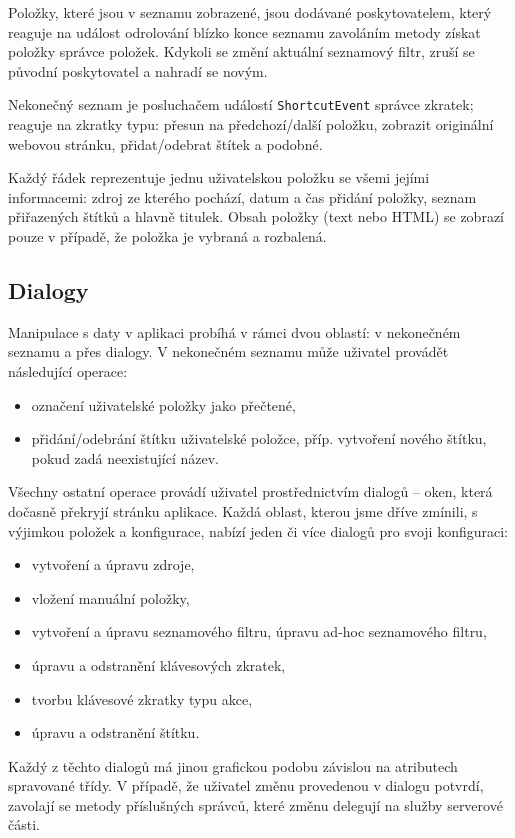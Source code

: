 Položky, které jsou v seznamu zobrazené, jsou dodávané poskytovatelem, který reaguje na událost odrolování blízko konce seznamu zavoláním metody získat položky správce položek.
Kdykoli se změní aktuální seznamový filtr, zruší se původní poskytovatel a nahradí se novým.

Nekonečný seznam je posluchačem událostí \verb|ShortcutEvent| správce zkratek; reaguje na zkratky typu: přesun na předchozí/další položku, zobrazit originální webovou stránku, přidat/odebrat štítek a podobné.

Každý řádek reprezentuje jednu uživatelskou položku se všemi jejími informacemi: zdroj ze kterého pochází, datum a čas přidání položky, seznam přiřazených štítků a hlavně titulek.
Obsah položky (text nebo HTML) se zobrazí pouze v případě, že položka je vybraná a rozbalená.

\subsection{Dialogy}
Manipulace s daty v aplikaci probíhá v rámci dvou oblastí: v nekonečném seznamu a přes dialogy.
V nekonečném seznamu může uživatel provádět následující operace:
\begin{itemize}
	\item označení uživatelské položky jako přečtené,
	\item přidání/odebrání štítku uživatelské položce, příp. vytvoření nového štítku, pokud zadá neexistující název.
\end{itemize}

Všechny ostatní operace provádí uživatel prostřednictvím dialogů -- oken, která dočasně překryjí stránku aplikace.
Každá oblast, kterou jsme dříve zmínili, s výjimkou položek a konfigurace, nabízí jeden či více dialogů pro svoji konfiguraci:
\begin{itemize}
	\item vytvoření a úpravu zdroje,
	\item vložení manuální položky,
	\item vytvoření a úpravu seznamového filtru, úpravu ad-hoc seznamového filtru,
	\item úpravu a odstranění klávesových zkratek,
	\item tvorbu klávesové zkratky typu akce,
	\item úpravu a odstranění štítku.
\end{itemize}

Každý z těchto dialogů má jinou grafickou podobu závislou na atributech spravované třídy.
V případě, že uživatel změnu provedenou v dialogu potvrdí, zavolají se metody příslušných správců, které změnu delegují na služby serverové části.

